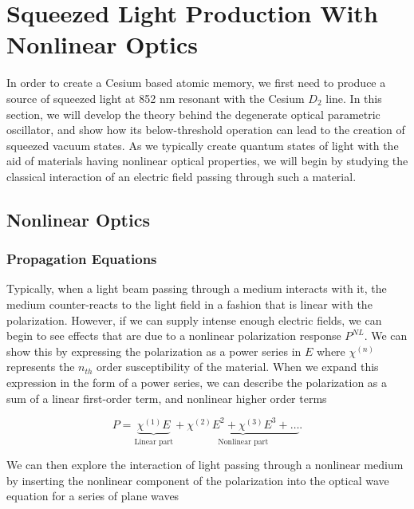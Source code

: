 \chapter{Squeezed Light Production With Nonlinear Optics}
\label{ch:3}
\minitoc

In order to create a Cesium based atomic memory, we first need to produce a source of squeezed light at 852 nm resonant with the Cesium $D_2$ line.  In this section, we will develop the theory behind the degenerate optical parametric oscillator, and show how its below-threshold operation can lead to the creation of squeezed vacuum states.  As we typically create quantum states of light with the aid of materials having nonlinear optical properties, we will begin by studying the classical interaction of an electric field passing through such a material.


\section{Nonlinear Optics}
\label{nonlinear_optics}

\subsection{Propagation Equations} 
\label{propagation_equations}


\noindent
Typically, when a light beam passing through a medium interacts with it, the
medium counter-reacts to the light field in a fashion that is linear with the
polarization.  However, if we can supply intense enough electric fields, we can
begin to see effects that are due to a nonlinear polarization response
$P^{NL}$.  We can show this by expressing the polarization as a power series in $E$ where $\chi^{(n)}$ represents the $n_{th}$ order susceptibility of the material.  When we expand this expression in the form of a power series, we can describe the polarization as a sum of a linear first-order term, and nonlinear higher order terms 
   
\begin{equation}
  \label{eq:full_polarization}
  P = \underbrace{\chi^{(1)} E}_{\text{Linear part}} + \underbrace{\chi^{(2)}
E^2 + \chi^{(3)} E^3 + \ldots}_{\text{Nonlinear part}}.
\end{equation}

\noindent
We can then explore the interaction of light passing through a nonlinear medium
by inserting the nonlinear component of the polarization into the optical wave equation for a series of plane waves \cite{boyd}

